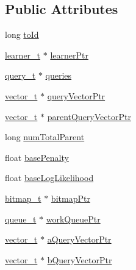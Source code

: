 \subsection*{Public Attributes}
\begin{DoxyCompactItemize}
\item 
long \hyperlink{structfindBestTaskArg_af91b96ead12e1cfa6238264c927ff346}{to\-Id}
\item 
\hyperlink{learner_8h_a348f51bb60a71c0fa288fb99d7945057}{learner\-\_\-t} $\ast$ \hyperlink{structfindBestTaskArg_adf11ba1c4646ac8f040ba92d66aa6714}{learner\-Ptr}
\item 
\hyperlink{query_8h_a9e853aa52e22f13d41749d4245b61276}{query\-\_\-t} $\ast$ \hyperlink{structfindBestTaskArg_a72be21280ba6b7af0eb5e1c3e605e21d}{queries}
\item 
\hyperlink{vector_8h_a5a1bca6fa9a3f18a2897623094d918da}{vector\-\_\-t} $\ast$ \hyperlink{structfindBestTaskArg_a6d9b010988ec1af3a2109606cd8c549f}{query\-Vector\-Ptr}
\item 
\hyperlink{vector_8h_a5a1bca6fa9a3f18a2897623094d918da}{vector\-\_\-t} $\ast$ \hyperlink{structfindBestTaskArg_a1dedcec32553225834fb69a0bd9366cc}{parent\-Query\-Vector\-Ptr}
\item 
long \hyperlink{structfindBestTaskArg_a11f980c02bd25b58c925d195d8e6b5b4}{num\-Total\-Parent}
\item 
float \hyperlink{structfindBestTaskArg_aa549a72520a101bb9f0e504a9bde9c8f}{base\-Penalty}
\item 
float \hyperlink{structfindBestTaskArg_a15bfff6042c49c51ab37e5a96c718466}{base\-Log\-Likelihood}
\item 
\hyperlink{bitmap_8h_ab8cbe0b7e8894a92ab1c7b17acebcc83}{bitmap\-\_\-t} $\ast$ \hyperlink{structfindBestTaskArg_aadb5b4887c1e74d42cdea1cc6bb085fe}{bitmap\-Ptr}
\item 
\hyperlink{queue_8h_aa8acf648f3b0c69d7e132fcc61dc58c7}{queue\-\_\-t} $\ast$ \hyperlink{structfindBestTaskArg_a63d6c4ace7034e3462bd320f6d17281e}{work\-Queue\-Ptr}
\item 
\hyperlink{vector_8h_a5a1bca6fa9a3f18a2897623094d918da}{vector\-\_\-t} $\ast$ \hyperlink{structfindBestTaskArg_ad743923e6bddae9af4c04c2aefa90a75}{a\-Query\-Vector\-Ptr}
\item 
\hyperlink{vector_8h_a5a1bca6fa9a3f18a2897623094d918da}{vector\-\_\-t} $\ast$ \hyperlink{structfindBestTaskArg_a40f684149469a51e197f7c24379fa35b}{b\-Query\-Vector\-Ptr}
\end{DoxyCompactItemize}


